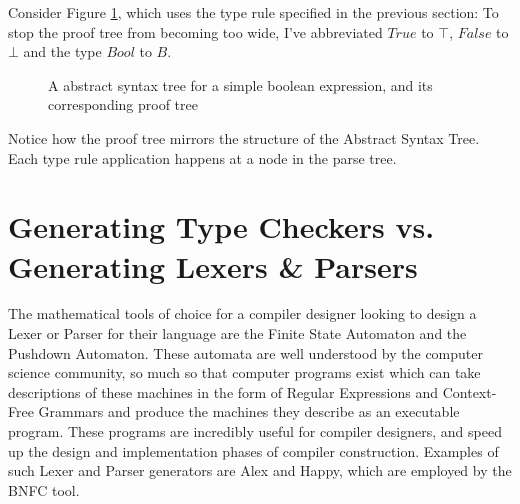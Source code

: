\documentclass{UoYCSproject}
\begin{document}
Consider Figure \ref{fig:ParseAndProofTree}, which uses the
type rule specified in the previous section:
To stop the proof tree from becoming too wide, I've abbreviated $True$ to $\top$,
$False$ to $\bot$ and the type $Bool$ to $B$.
\begin{figure}
    \caption{A abstract syntax tree for a simple boolean expression, and its corresponding proof tree}
    \label{fig:ParseAndProofTree}
\end{figure}
Notice how the proof tree mirrors the structure of the Abstract Syntax Tree.
Each type rule application happens at a node in the parse tree.

\section{Generating Type Checkers vs. Generating Lexers \& Parsers}
The mathematical tools of choice for a compiler designer looking to design
a Lexer or Parser for their language are the Finite State Automaton and the
Pushdown Automaton. These automata are well understood by the computer science
community, so much so that computer programs exist which can take descriptions
of these machines in the form of Regular Expressions and Context-Free Grammars
and produce the machines they describe as an executable program. These programs
are incredibly useful for compiler designers, and speed up the design and
implementation phases of compiler construction. Examples of such Lexer and Parser
generators are Alex and Happy, which are employed by the BNFC tool.
\end{document}
